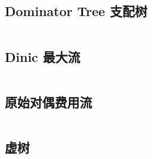 \documentclass[titlepage, a4paper, 11pt]{article}
\begin{document}
\begin{spacing}{1.15}
				\subsection{Dominator Tree 支配树}
					\inputminted{cpp}{src/TreeandGraph/支配树.cpp}
				\subsection{Dinic 最大流}
					
					\inputminted[highlightlines={8,30}]{cpp}{src/TreeandGraph/Dinic.cpp}
				\subsection{原始对偶费用流}
					\inputminted[highlightlines={2,3,22,25,28,31,42,43}]{cpp}{src/TreeandGraph/多路增广费用流.cpp}
				\subsection{虚树}
				\inputminted{cpp}{src/TreeandGraph/虚树.cpp}
				

\end{spacing}
\end{document}
